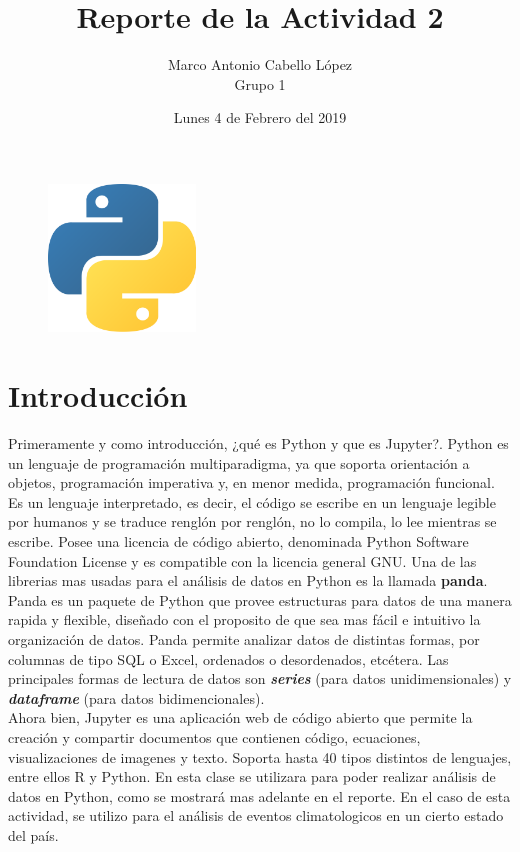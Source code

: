 \documentclass[12pt]{article}
\title{Reporte de la Actividad 2}
\author{Marco Antonio Cabello López \\ Grupo 1}
\date{Lunes 4 de Febrero del 2019}
\begin{document}
\maketitle 
\begin{figure}
    \centering
    \includegraphics[width=0.35\textwidth]{LogoP.png}
\end{figure}
\section{Introducción}
Primeramente y como introducción, ¿qué es Python y que es Jupyter?. Python es un lenguaje de programación multiparadigma, ya que soporta orientación a objetos, programación imperativa y, en menor medida, programación funcional. Es un lenguaje interpretado, es decir, el código se escribe en un lenguaje legible por humanos y se traduce renglón por renglón, no lo compila, lo lee mientras se escribe. Posee una licencia de código abierto, denominada Python Software Foundation License y es compatible con la licencia general GNU. Una de las librerias mas usadas para el análisis de datos en Python es la llamada \textbf{panda}. Panda es un paquete de Python que provee estructuras para datos de una manera rapida y flexible, diseñado con el proposito de que sea mas fácil e intuitivo la organización de datos. Panda permite analizar datos de distintas formas, por columnas de tipo SQL o Excel, ordenados o desordenados, etcétera. Las principales formas de lectura de datos son \textbf{\textit{series}} (para datos unidimensionales) y \textbf{\textit{dataframe}} (para datos bidimencionales). \\
Ahora bien, Jupyter es una aplicación web de código abierto que permite la creación y compartir documentos que contienen código, ecuaciones, visualizaciones de imagenes y texto. Soporta hasta 40 tipos distintos de lenguajes, entre ellos R y Python. En esta clase se utilizara para poder realizar análisis de datos en Python, como se mostrará mas adelante en el reporte. En el caso de esta actividad, se utilizo para el análisis de eventos climatologicos en un cierto estado del país.
\end{document}
